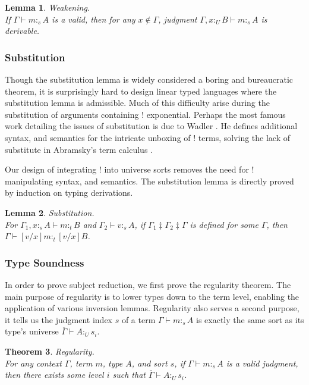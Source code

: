 \documentclass{article}
\newtheorem{theorem}{Theorem}[section]
\newtheorem{lemma}[theorem]{Lemma}
\theoremstyle{definition}
\newcommand{\utype}{:_{\scriptscriptstyle U}}
\newcommand{\stype}[1]{:_#1}
\newcommand{\mrg}[3]{#1\ddagger#2\ddagger#3}
\begin{document}
  \begin{lemma} Weakening. \\
    If $\Gamma \vdash m \stype{s} A$ is a valid, then for any $x \notin \Gamma$, judgment $\Gamma, x \utype B \vdash m \stype{s} A$ is derivable.
  \end{lemma}

  \subsubsection{Substitution} \label{subst}
  Though the substitution lemma is widely considered a boring and bureaucratic theorem, it is surprisingly hard to design linear typed languages where the substitution lemma is admissible. Much of this difficulty arise during the substitution of arguments containing ! exponential. Perhaps the most famous work detailing the issues of substitution is due to Wadler \cite{substitute}. He defines additional syntax, and semantics for the intricate unboxing of ! terms, solving the lack of substitute in Abramsky's term calculus \cite{abramsky1993}.

  Our design of integrating ! into universe sorts removes the need for ! manipulating syntax, and semantics. The substitution lemma is directly proved by induction on typing derivations.

  \begin{lemma} Substitution. \\
    For $\Gamma_1, x \stype{s} A \vdash m \stype{t} B$ and $\Gamma_2 \vdash v \stype{s} A$, if $\mrg{\Gamma_1}{\Gamma_2}{\Gamma}$ is defined for some $\Gamma$, then $\Gamma \vdash [v/x]m \stype{t} [v/x]B$.
  \end{lemma}

  \subsubsection{Type Soundness}
  In order to prove subject reduction, we first prove the regularity theorem. The main purpose of regularity is to lower types down to the term level, enabling the application of various inversion lemmas. Regularity also serves a second purpose, it tells us the judgment index $s$ of a term $\Gamma \vdash m \stype{s} A$ is exactly the same sort as its type's universe $\overline{\Gamma} \vdash A \utype s_i$.

  \begin{theorem} Regularity. \\
     For any context $\Gamma$, term $m$, type $A$, and sort $s$, if $\Gamma \vdash m \stype{s} A$ is a valid judgment, then there exists some level $i$ such that $\overline{\Gamma} \vdash A \utype s_i$.
    \label{regularity}
  \end{theorem}
\end{document}

